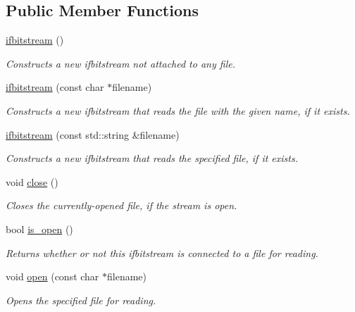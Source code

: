 \subsection*{Public Member Functions}
\begin{DoxyCompactItemize}
\item 
\mbox{\hyperlink{classifbitstream_a2d6148d42c4e6bcac770d185b25a691e}{ifbitstream}} ()
\begin{DoxyCompactList}\small\item\em Constructs a new ifbitstream not attached to any file. \end{DoxyCompactList}\item 
\mbox{\hyperlink{classifbitstream_a5fe2eb72a345e67256791c172a29bbba}{ifbitstream}} (const char $\ast$filename)
\begin{DoxyCompactList}\small\item\em Constructs a new ifbitstream that reads the file with the given name, if it exists. \end{DoxyCompactList}\item 
\mbox{\hyperlink{classifbitstream_a96869868971e5d55945f1ab3d8bde584}{ifbitstream}} (const std\+::string \&filename)
\begin{DoxyCompactList}\small\item\em Constructs a new ifbitstream that reads the specified file, if it exists. \end{DoxyCompactList}\item 
void \mbox{\hyperlink{classifbitstream_a5ae591df94fc66ccb85cbb6565368bca}{close}} ()
\begin{DoxyCompactList}\small\item\em Closes the currently-\/opened file, if the stream is open. \end{DoxyCompactList}\item 
bool \mbox{\hyperlink{classifbitstream_a2f57f54d8c03b615bb31eee091d8a88a}{is\+\_\+open}} ()
\begin{DoxyCompactList}\small\item\em Returns whether or not this ifbitstream is connected to a file for reading. \end{DoxyCompactList}\item 
void \mbox{\hyperlink{classifbitstream_a57f80da790b202b27353cd8f8415b382}{open}} (const char $\ast$filename)
\begin{DoxyCompactList}\small\item\em Opens the specified file for reading. \end{DoxyCompactList}\item 

\end{DoxyCompactItemize}
